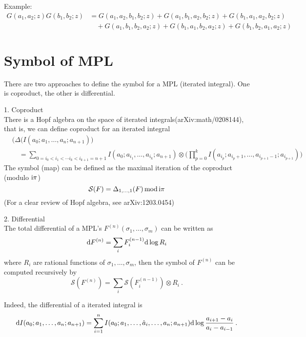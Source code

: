 \documentclass[12pt]{article}
\begin{document}
Example:
\begin{align*}
    G(a_{1},a_{2};z) G(b_{1},b_{2};z) &= G(a_{1},a_{2},b_{1},b_{2};z)+G(a_{1},b_{1},a_{2},b_{2};z) + G(b_{1},a_{1},a_{2},b_{2};z) \\
    &\quad + G(a_{1},b_{1},b_{2},a_{2};z)+ G(b_{1},a_{1},b_{2},a_{2};z)+G(b_{1},b_{2},a_{1},a_{2};z)
\end{align*}

\section{Symbol of MPL}

There are two approaches to define the symbol for a MPL (iterated integral). One is coproduct, the other is differential.

1. Coproduct \\
There is a Hopf algebra on the space of iterated integrals(arXiv:math/0208144), that is, we can define coproduct for an iterated integral
\begin{align*}
   &\bigl( \Delta(I(a_{0};a_{1},\ldots,a_{n};a_{n+1})\bigr)    \\
   &\quad =\sum_{0=i_{0}<i_{1}<\cdots i_{k}<i_{k+1}=n+1} I(a_{0};a_{i_{1}},\ldots,a_{i_{k}};a_{n+1})\otimes 
   \Biggl(\prod_{p=0}^{k}I(a_{i_{p}};a_{i_{p}+1},\ldots,a_{i_{p+1}-1};a_{i_{p+1}})\Biggr)
\end{align*}
The symbol (map) can be defined as the maximal iteration of the coproduct (modulo $\mathrm{i}\pi$)
\begin{equation}
    \mathcal{S}(F)=\Delta_{1,\ldots,1}(F) \operatorname{mod}\mathrm{i}\pi
\end{equation}
(For a clear review of Hopf algebra, see arXiv:1203.0454)

2.  Differential  \\
The total differential of a MPL's $F^{(n)}(\sigma_{1},\ldots,\sigma_{m})$ can be written as
\begin{equation}
    \mathrm{d} F^{(n)} =\sum_{i}F_{i}^{(n-1)} \mathrm{d} \log R_{i}
\end{equation}
where $R_{i}$ are rational functions of $\sigma_{1},\ldots,\sigma_{m}$, then the symbol of $F^{(n)}$ can be computed recursively by 
\begin{equation}
        \mathcal{S}(F^{(n)}) = \sum_{i}\mathcal{S} (F_{i}^{(n-1)})\otimes R_{i} \:.
\end{equation}

Indeed, the differential of a iterated integral is 
\begin{equation}
    \mathrm{d} I(a_{0};a_{1},\ldots,a_{n};a_{n+1})=\sum_{i=1}^{n}I(a_{0};a_{1},\ldots,\hat{a}_{i},\ldots,a_{n};a_{n+1})
    \mathrm{d}\log\frac{a_{i+1}-a_{i}}{a_{i}-a_{i-1}} \:.
\end{equation}
    
\end{document}

